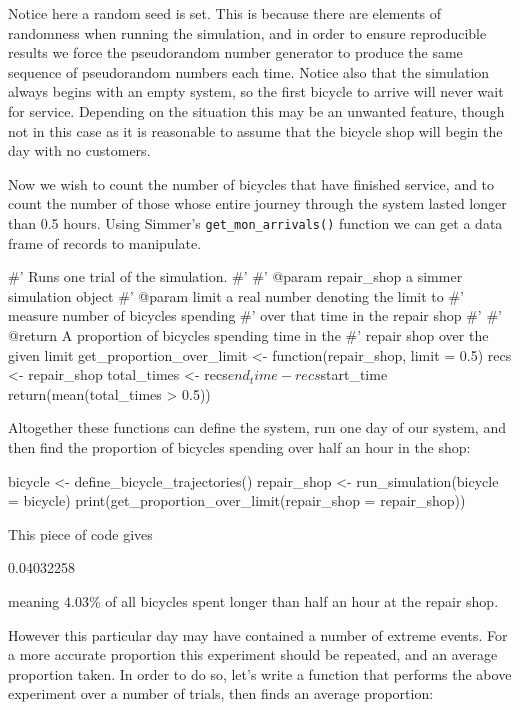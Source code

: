 Notice here a random seed is set. This is because there are elements of
randomness when running the simulation, and in order to ensure reproducible
results we force the pseudorandom number generator to produce the same sequence
of pseudorandom numbers each time.
Notice also that the simulation always begins with an empty system, so the first
bicycle to arrive will never wait for service. Depending on the situation this
may be an unwanted feature, though not in this case as it is reasonable to
assume that the bicycle shop will begin the day with no customers.

Now we wish to count the number of bicycles that have finished service, and to
count the number of those whose entire journey through the system lasted longer
than 0.5 hours. Using Simmer's \texttt{get_mon_arrivals()} function we
can get a data frame of records to manipulate.

\begin{Rin}
#' Runs one trial of the simulation.
#'
#' @param repair_shop a simmer simulation object
#' @param limit a real number denoting the limit to
#'              measure number of bicycles spending
#'              over that time in the repair shop
#'
#' @return A proportion of bicycles spending time in the
#'         repair shop over the given limit
get_proportion_over_limit <- function(repair_shop, limit = 0.5) {
  recs <- repair_shop %
  total_times <- recs$end_time - recs$start_time
  return(mean(total_times > 0.5))
}
\end{Rin}

Altogether these functions can define the system, run one day of our system, and
then find the proportion of bicycles spending over half an hour in the shop:

\begin{Rin}
bicycle <- define_bicycle_trajectories()
repair_shop <- run_simulation(bicycle = bicycle)
print(get_proportion_over_limit(repair_shop = repair_shop))
\end{Rin}

This piece of code gives

\begin{Rout}
[1] 0.04032258
\end{Rout}

meaning 4.03\% of all bicycles spent longer than half an hour at the repair
shop.

However this particular day may have contained a number of extreme events.
For a more accurate proportion this experiment should be repeated, and an
average proportion taken.
In order to do so, let's write a function that performs the above experiment
over a number of trials, then finds an average proportion:

